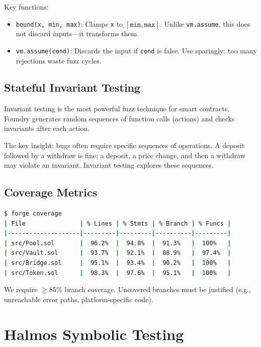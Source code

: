 \documentclass[11pt,a4paper]{article}
\begin{document}
Key functions:
\begin{itemize}[nosep]
  \item \texttt{bound(x, min, max)}: Clamps \texttt{x} to $[\texttt{min}, \texttt{max}]$.
    Unlike \texttt{vm.assume}, this does not discard inputs---it transforms them.
  \item \texttt{vm.assume(cond)}: Discards the input if \texttt{cond} is false. Use
    sparingly: too many rejections waste fuzz cycles.
\end{itemize}

\subsection{Stateful Invariant Testing}

Invariant testing is the most powerful fuzz technique for smart contracts. Foundry
generates random sequences of function calls (actions) and checks invariants after each
action.

The key insight: bugs often require specific sequences of operations. A deposit followed
by a withdraw is fine; a deposit, a price change, and then a withdraw may violate an
invariant. Invariant testing explores these sequences.

\subsection{Coverage Metrics}

\begin{lstlisting}[language=bash,caption={Foundry coverage report}]
$ forge coverage
| File               | % Lines | % Stmts | % Branch | % Funcs |
|--------------------|---------|---------|----------|---------|
| src/Pool.sol       |  96.2%  |  94.8%  |  91.3%   |  100%   |
| src/Vault.sol      |  93.7%  |  92.1%  |  88.9%   |  97.4%  |
| src/Bridge.sol     |  95.1%  |  93.4%  |  90.2%   |  100%   |
| src/Token.sol      |  98.3%  |  97.6%  |  95.1%   |  100%   |
\end{lstlisting}

We require $\geq$85\% branch coverage. Uncovered branches must be justified (e.g.,
unreachable error paths, platform-specific code).

\section{Halmos Symbolic Testing}
\end{document}
